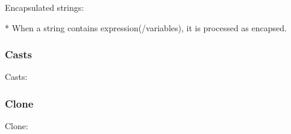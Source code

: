 \documentclass[../main.tex]{subfiles}
\begin{document}
    Encapsulated strings:
    \begin{prooftree}
    \end{prooftree}
    * When a string contains expression(/variables), it is processed as encapsed.
    
    \hrulefill
    
    \subsubsection{Casts}
    Casts:
    \begin{prooftree}
    \end{prooftree}
    \begin{prooftree}
    \end{prooftree}
    \begin{prooftree}
    \end{prooftree}    
    \begin{prooftree}
    \end{prooftree}
    \begin{prooftree}
    \end{prooftree}
    \begin{prooftree}
    \end{prooftree}
    
    \hrulefill
            
    \subsubsection{Clone}
    Clone:
    \begin{prooftree}
    \end{prooftree}
    
    \hrulefill
    
\end{document}
